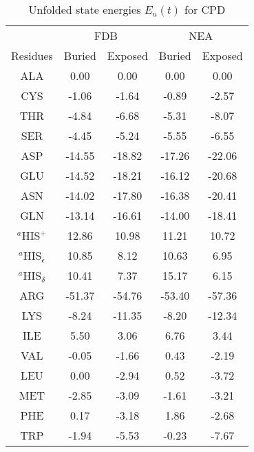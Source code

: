 \documentclass[a4paper,12pt]{article}
\begin{document}
\begin{table}[h]
\caption{Unfolded state energies $E_u(t)$ for CPD}
\label{tab:Eref}                      
\begin{center}
\small
\begin{tabular}{ccccc} \hline \hline
        & \multicolumn{2}{c}{\hrulefill FDB \hrulefill} & \multicolumn{2}{c}{\hrulefill NEA \hrulefill}\\
Residues               & Buried  & Exposed  &  Buried   & Exposed  \\ \hline
ALA                    &   0.00  &    0.00  &    0.00     &    0.00  \\	            
CYS                    &  -1.06  &   -1.64  &   -0.89     &   -2.57  \\	
THR                    &  -4.84  &   -6.68  &   -5.31     &   -8.07  \\	
SER                    &  -4.45  &   -5.24  &   -5.55     &   -6.55  \\	
ASP                    & -14.55  &  -18.82  &   -17.26    &  -22.06  \\	
GLU                    & -14.52  &  -18.21  &   -16.12    &  -20.68  \\	
ASN                    & -14.02  &  -17.80  &   -16.38    &  -20.41  \\	
GLN                    & -13.14  &  -16.61  &   -14.00    &  -18.41  \\	
$^a$HIS$^+$            &  12.86  &   10.98  &    11.21    &   10.72  \\	
$^a$HIS$_{\epsilon}$     &  10.85  &    8.12  &    10.63    &    6.95  \\	
$^a$HIS$_{\delta}$       &  10.41  &    7.37  &    15.17    &    6.15  \\	
ARG                    & -51.37  &  -54.76  &   -53.40    &  -57.36  \\	
LYS                    &  -8.24  &  -11.35  &   -8.20     &  -12.34  \\	
ILE                    &   5.50  &    3.06  &    6.76     &    3.44  \\	
VAL                    &  -0.05  &   -1.66  &    0.43     &   -2.19  \\	
LEU                    &   0.00  &   -2.94  &    0.52     &   -3.72  \\	
MET                    &  -2.85  &   -3.09  &   -1.61     &   -3.21  \\	
PHE                    &   0.17  &   -3.18  &    1.86     &   -2.68  \\	
TRP                    &  -1.94  &   -5.53  &   -0.23     &   -7.67  \\	

\end{tabular}
\end{center}
\end{table}
\end{document}
